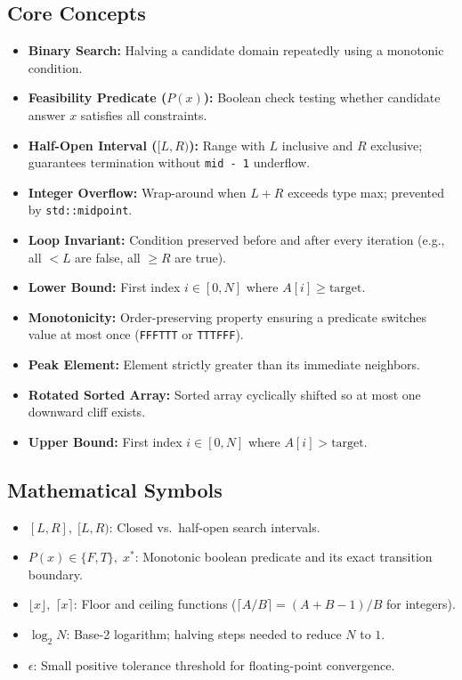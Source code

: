 \documentclass[11pt,a4paper]{article}
\theoremstyle{definition}
\begin{document}
\subsection*{Core Concepts}
\begin{itemize}
    \item \textbf{Binary Search:} Halving a candidate domain repeatedly using a monotonic condition.
    \item \textbf{Feasibility Predicate ($P(x)$):} Boolean check testing whether candidate answer $x$ satisfies all constraints.
    \item \textbf{Half-Open Interval ($[L, R)$):} Range with $L$ inclusive and $R$ exclusive; guarantees termination without \texttt{mid - 1} underflow.
    \item \textbf{Integer Overflow:} Wrap-around when $L + R$ exceeds type max; prevented by \texttt{std::midpoint}.
    \item \textbf{Loop Invariant:} Condition preserved before and after every iteration (e.g., all $< L$ are false, all $\ge R$ are true).
    \item \textbf{Lower Bound:} First index $i \in [0, N]$ where $A[i] \ge \text{target}$.
    \item \textbf{Monotonicity:} Order-preserving property ensuring a predicate switches value at most once (\texttt{FFFTTT} or \texttt{TTTFFF}).
    \item \textbf{Peak Element:} Element strictly greater than its immediate neighbors.
    \item \textbf{Rotated Sorted Array:} Sorted array cyclically shifted so at most one downward cliff exists.
    \item \textbf{Upper Bound:} First index $i \in [0, N]$ where $A[i] > \text{target}$.
\end{itemize}

\subsection*{Mathematical Symbols}
\begin{itemize}
    \item $[L, R],\; [L, R)$: Closed vs.\ half-open search intervals.
    \item $P(x) \in \{F, T\},\; x^*$: Monotonic boolean predicate and its exact transition boundary.
    \item $\lfloor x \rfloor,\; \lceil x \rceil$: Floor and ceiling functions ($\lceil A / B \rceil = (A + B - 1) / B$ for integers).
    \item $\log_2 N$: Base-2 logarithm; halving steps needed to reduce $N$ to $1$.
    \item $\epsilon$: Small positive tolerance threshold for floating-point convergence.
\end{itemize}
\end{document}
